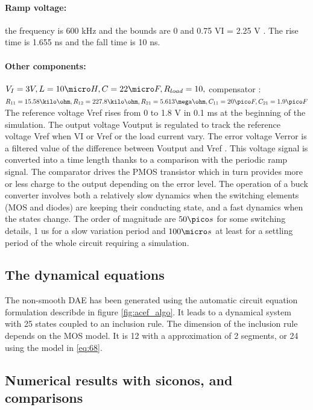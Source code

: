 \paragraph{Ramp voltage:} the frequency is 600 kHz and the bounds are 0 and 0.75 VI = 2.25 V .
The rise time is 1.655 ns and the fall time is 10 ns.
\paragraph{Other components:} $V_I = 3 V , L = 10 \micro H, C = 22 \micro F,R_{load} = 10,$ compensator
: $R_{11} = 15.58 \kilo \ohm , R_{12} = 227.8 \kilo \ohm ,R_{21} = 5.613 \mega \ohm, C_{11} = 20 \pico F, C_{21} =
1.9 \pico F$
The reference voltage Vref rises from 0 to 1.8 V in 0.1 ms at the beginning
of the simulation.
The output voltage Voutput is regulated to track the reference voltage Vref when
VI or Vref or the load current vary. The error voltage Verror is a filtered value
of the difference between Voutput and Vref . This voltage signal is converted
into a time length thanks to a comparison with the periodic ramp signal. The
comparator drives the PMOS transistor which in turn provides more or less
charge to the output depending on the error level. The operation of a buck
converter involves both a relatively slow dynamics when the switching elements
(MOS and diodes) are keeping their conducting state, and a fast dynamics when
the states change. The order of magnitude are $ 50 \pico s$ for some switching details,
1 us for a slow variation period and $100 \micro s$ at least for a settling period of the
whole circuit requiring a simulation.

\subsection{The dynamical equations}
\label{section41}
The non-smooth DAE has been generated using the automatic circuit equation formulation describde in figure
\ref{fig:acef_algo}. It leads to a dynamical system with 25 states coupled to an inclusion rule. The dimension of the inclusion
rule depends on the MOS model. It is 12 with a approximation of 2 segments, or 24 using the
model in \ref{eq:68}.  

\subsection{Numerical results with {\sc siconos},  and comparisons}
\label{section42}
